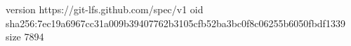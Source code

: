 version https://git-lfs.github.com/spec/v1
oid sha256:7ec19a6967cc31a009b39407762b3105cfb52ba3bc0f8c06255b6050fbdf1339
size 7894
